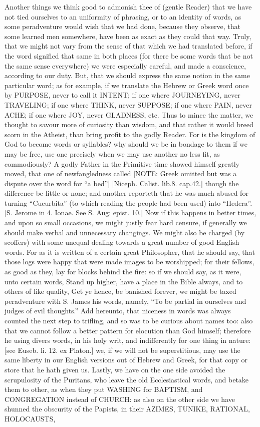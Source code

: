 {\par }{\IP Another things we think good to admonish thee of (gentle Reader) that we have not tied ourselves to an uniformity of phrasing, or to an identity of words, as some peradventure would wish that we had done, because they observe, that some learned men somewhere, have been as exact as they could that way. Truly, that we might not vary from the sense of that which we had translated before, if the word signified that same in both places (for there be some words that be not the same sense everywhere) we were especially careful, and made a conscience, according to our duty. But, that we should express the same notion in the same particular word; as for example, if we translate the Hebrew or Greek word once by PURPOSE, never to call it INTENT; if one where JOURNEYING, never TRAVELING; if one where THINK, never SUPPOSE; if one where PAIN, never ACHE; if one where JOY, never GLADNESS, etc. Thus to mince the matter, we thought to savour more of curiosity than wisdom, and that rather it would breed scorn in the Atheist, than bring profit to the godly Reader. For is the kingdom of God to become words or syllables? why should we be in bondage to them if we may be free, use one precisely when we may use another no less fit, as commodiously? A godly Father in the Primitive time showed himself greatly moved, that one of newfangledness called [NOTE: Greek omitted but was a dispute over the word for “a bed”] [Niceph. Calist. lib.8. cap.42.] though the difference be little or none; and another reporteth that he was much abused for turning “Cucurbita” (to which reading the people had been used) into “Hedera”. [S. Jerome in 4. Ionae. See S. Aug: epist. 10.] Now if this happens in better times, and upon so small occasions, we might justly fear hard censure, if generally we should make verbal and unnecessary changings. We might also be charged (by scoffers) with some unequal dealing towards a great number of good English words. For as it is written of a certain great Philosopher, that he should say, that those logs were happy that were made images to be worshipped; for their fellows, as good as they, lay for blocks behind the fire: so if we should say, as it were, unto certain words, Stand up higher, have a place in the Bible always, and to others of like quality, Get ye hence, be banished forever, we might be taxed peradventure with S. James his words, namely, “To be partial in ourselves and judges of evil thoughts.” Add hereunto, that niceness in words was always counted the next step to trifling, and so was to be curious about names too: also that we cannot follow a better pattern for elocution than God himself; therefore he using divers words, in his holy writ, and indifferently for one thing in nature: [see Euseb. li. 12. ex Platon.] we, if we will not be superstitious, may use the same liberty in our English versions out of Hebrew and Greek, for that copy or store that he hath given us. Lastly, we have on the one side avoided the scrupulosity of the Puritans, who leave the old Ecclesiastical words, and betake them to other, as when they put WASHING for BAPTISM, and CONGREGATION instead of CHURCH: as also on the other side we have shunned the obscurity of the Papists, in their AZIMES, TUNIKE, RATIONAL, HOLOCAUSTS, }
